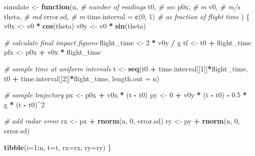 \documentclass[]{article}
\newenvironment{Shaded}{\begin{snugshade}}{\end{snugshade}}
\newcommand{\CommentTok}[1]{\textcolor[rgb]{0.56,0.35,0.01}{\textit{#1}}}
\newcommand{\ControlFlowTok}[1]{\textcolor[rgb]{0.13,0.29,0.53}{\textbf{#1}}}
\newcommand{\DataTypeTok}[1]{\textcolor[rgb]{0.13,0.29,0.53}{#1}}
\newcommand{\DecValTok}[1]{\textcolor[rgb]{0.00,0.00,0.81}{#1}}
\newcommand{\FloatTok}[1]{\textcolor[rgb]{0.00,0.00,0.81}{#1}}
\newcommand{\KeywordTok}[1]{\textcolor[rgb]{0.13,0.29,0.53}{\textbf{#1}}}
\newcommand{\NormalTok}[1]{#1}
\newcommand{\OperatorTok}[1]{\textcolor[rgb]{0.81,0.36,0.00}{\textbf{#1}}}
\newcommand{\StringTok}[1]{\textcolor[rgb]{0.31,0.60,0.02}{#1}}
\begin{document}
\begin{Shaded}
\begin{Highlighting}[]
\NormalTok{simulate <-}\StringTok{ }\ControlFlowTok{function}\NormalTok{(n,        }\CommentTok{# number of readings }
\NormalTok{                     t0,       }\CommentTok{# sec}
\NormalTok{                     p0x,      }\CommentTok{# m}
\NormalTok{                     v0,       }\CommentTok{# m/s}
\NormalTok{                     theta,    }\CommentTok{# rad}
\NormalTok{                     error.sd, }\CommentTok{# m}
                     \DataTypeTok{time.interval =} \KeywordTok{c}\NormalTok{(}\DecValTok{0}\NormalTok{, }\DecValTok{1}\NormalTok{) }\CommentTok{# as fraction of flight time}
\NormalTok{                    ) }
\NormalTok{\{}
\NormalTok{  v0x <-}\StringTok{ }\NormalTok{v0 }\OperatorTok{*}\StringTok{ }\KeywordTok{cos}\NormalTok{(theta)  }
\NormalTok{  v0y <-}\StringTok{ }\NormalTok{v0 }\OperatorTok{*}\StringTok{ }\KeywordTok{sin}\NormalTok{(theta)}
  
  \CommentTok{# calculate final impact figures }
\NormalTok{  flight_time <-}\StringTok{ }\DecValTok{2} \OperatorTok{*}\StringTok{ }\NormalTok{v0y }\OperatorTok{/}\StringTok{ }\NormalTok{g}
\NormalTok{  tf  <-}\StringTok{ }\NormalTok{t0 }\OperatorTok{+}\StringTok{ }\NormalTok{flight_time}
\NormalTok{  pfx <-}\StringTok{ }\NormalTok{p0x }\OperatorTok{+}\StringTok{ }\NormalTok{v0x }\OperatorTok{*}\StringTok{ }\NormalTok{flight_time}
  
  \CommentTok{# sample time at uniform intervals}
\NormalTok{  t <-}\StringTok{ }\KeywordTok{seq}\NormalTok{(t0 }\OperatorTok{+}\StringTok{ }\NormalTok{time.interval[[}\DecValTok{1}\NormalTok{]]}\OperatorTok{*}\NormalTok{flight_time, }
\NormalTok{           t0 }\OperatorTok{+}\StringTok{ }\NormalTok{time.interval[[}\DecValTok{2}\NormalTok{]]}\OperatorTok{*}\NormalTok{flight_time, }
           \DataTypeTok{length.out =}\NormalTok{ n)}

  \CommentTok{# sample trajectory}
\NormalTok{  px <-}\StringTok{ }\NormalTok{p0x }\OperatorTok{+}\StringTok{ }\NormalTok{v0x }\OperatorTok{*}\StringTok{ }\NormalTok{(t }\OperatorTok{-}\StringTok{ }\NormalTok{t0)}
\NormalTok{  py <-}\StringTok{   }\DecValTok{0} \OperatorTok{+}\StringTok{ }\NormalTok{v0y }\OperatorTok{*}\StringTok{ }\NormalTok{(t }\OperatorTok{-}\StringTok{ }\NormalTok{t0) }\OperatorTok{-}\StringTok{ }\FloatTok{0.5} \OperatorTok{*}\StringTok{ }\NormalTok{g }\OperatorTok{*}\StringTok{ }\NormalTok{(t }\OperatorTok{-}\StringTok{ }\NormalTok{t0)}\OperatorTok{^}\DecValTok{2}
  
  \CommentTok{# add radar error }
\NormalTok{  rx <-}\StringTok{ }\NormalTok{px }\OperatorTok{+}\StringTok{ }\KeywordTok{rnorm}\NormalTok{(n, }\DecValTok{0}\NormalTok{, error.sd)}
\NormalTok{  ry <-}\StringTok{ }\NormalTok{py }\OperatorTok{+}\StringTok{ }\KeywordTok{rnorm}\NormalTok{(n, }\DecValTok{0}\NormalTok{, error.sd)}
  
  \KeywordTok{tibble}\NormalTok{(}\DataTypeTok{i=}\DecValTok{1}\OperatorTok{:}\NormalTok{n, }\DataTypeTok{t=}\NormalTok{t, }\DataTypeTok{rx=}\NormalTok{rx, }\DataTypeTok{ry=}\NormalTok{ry)}
\NormalTok{\}}
\end{Highlighting}
\end{Shaded}
\end{document}
